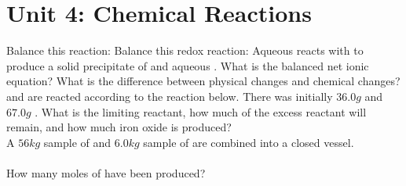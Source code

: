 \documentclass[../main.tex]{subfiles}
\begin{document}
\section{Unit 4: Chemical Reactions}
\ProblemSet
Balance this reaction:
\ProblemSet
Balance this redox reaction: 
\ProblemSet
Aqueous  reacts with  to produce a solid precipitate of  and aqueous . What is the balanced net ionic equation? 
\ProblemSet
What is the difference between physical changes and chemical changes?
\ProblemSet
{} and  are reacted according to the reaction below. There was initially \(36.0g\)  and \(67.0g\) . What is the limiting reactant, how much of the excess reactant will remain, and how much iron oxide is produced? \\
\ProblemSet
A \(56kg\) sample of  and \(6.0kg\) sample of  are combined into a closed vessel. \\
 \\
How many moles of  have been produced?
\end{document}
